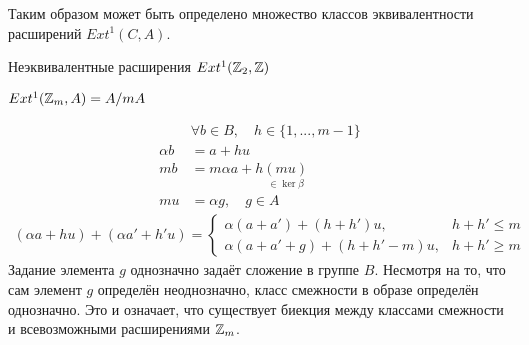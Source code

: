 \documentclass[../main.tex]{subfiles}
\begin{document}
\eee
Таким образом может быть определено множество классов эквивалентности расширений $Ext^1(C, A)$.
\begin{to_ex}
Неэквивалентные расширения $Ext^1(\mathbb{Z}_2, \mathbb{Z})$
\bee
{}
\eee
\end{to_ex}
\begin{to_ex}
$Ext^1(\mathbb{Z}_m, A) = A /mA$
\bee
{}
\eee

\begin{align*}
    &\forall b \in B,\quad h \in \{1, ..., m-1\} \\
    \alpha b &= a + h u \\
    mb &= m\alpha a + h\underset{\in\ker \beta }{(mu)}\\
    mu &= \alpha g, \quad g \in A
\end{align*}
\begin{align*}
    (\alpha a + h u )+(\alpha a' + h'u) = \begin{cases}\alpha(a + a') + (h + h')u, & h + h' \le m \\ \alpha(a+a'+g) + (h + h' - m)u, & h+h' \geq m \end{cases}
\end{align*}
Задание элемента $g$ однозначно задаёт сложение в группе $B$. Несмотря на то, что сам элемент $g$ определён неоднозначно, класс смежности в образе определён однозначно. Это и означает, что существует биекция между классами смежности и всевозможными расширениями $\mathbb{Z}_m$. 
\end{to_ex} 
\end{document}
